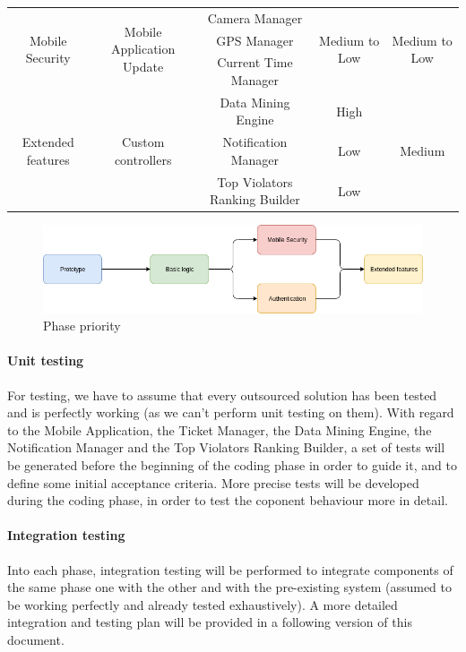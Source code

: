 \documentclass{article}
\begin{document}
\begin{table}[h]
\begin{center}
\begin{tabular}{|c|c|c|c|c|}
		\hline		
		\multirow{3}{*}{Mobile Security}		&\multirow{3}{*}{Mobile Application Update}	&Camera Manager		&\multirow{3}{*}{Medium to Low}&\multirow{3}{*}{Medium to Low}\\
											&											&GPS Manager						&				&								\\
											&											&Current Time Manager			&				&								\\
		\hline
		\multirow{3}{*}{Extended features}	&\multirow{3}{*}{Custom controllers}			&Data Mining Engine				&High			&\multirow{3}{*}{Medium}			\\
											&											&Notification Manager			&Low				&								\\
											&											&Top Violators Ranking Builder	&Low				&								\\
		\hline
\end{tabular}
\end{center}
\end{table}

\begin{figure}[h]
\includegraphics[width=\linewidth]{images/Implementation_phases.png}
\caption{Phase priority}
\label{fig:developmentPriorities}
\end{figure}

\paragraph{Unit testing}For testing, we have to assume that every outsourced solution has been tested and is perfectly working (as we can't perform unit testing on them). With regard to the Mobile Application, the Ticket Manager, the Data Mining Engine, the Notification Manager and the Top Violators Ranking Builder, a set of tests will be generated before the beginning of the coding phase in order to guide it, and to define some initial acceptance criteria. More precise tests will be developed during the coding phase, in order to test the coponent behaviour more in detail.

\paragraph{Integration testing} Into each phase, integration testing will be performed to integrate components of the same phase one with the other and with the pre-existing system (assumed to be working perfectly and already tested exhaustively). A more detailed integration and testing plan will be provided in a following version of this document.
\end{document}
